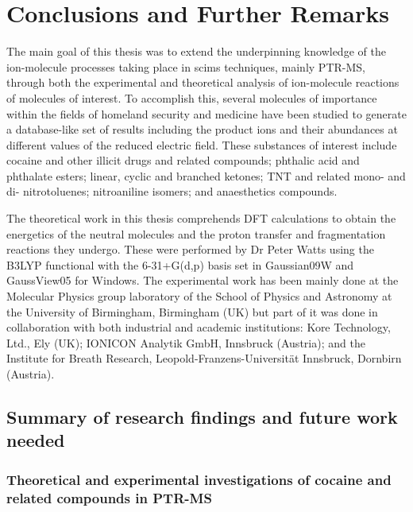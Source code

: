 \chapter{Conclusions and Further Remarks}

The main goal of this thesis was to extend the underpinning knowledge of the ion-molecule processes taking place in \acrshort{scims} techniques, mainly PTR-MS, through both the experimental and theoretical analysis of ion-molecule reactions of molecules of interest. %
%
To accomplish this, several molecules of importance within the fields of homeland security and medicine have been studied to generate a database-like set of results including the product ions and their abundances at different values of the reduced electric field.
%
These substances of interest include  cocaine and other illicit drugs and related compounds; 
phthalic acid and phthalate esters; 
linear, cyclic and branched ketones; 
TNT and related mono- and di- nitrotoluenes;
nitroaniline isomers;
and 
anaesthetics compounds.



The theoretical work in this thesis comprehends DFT calculations to obtain the energetics of the neutral molecules and the proton transfer and fragmentation reactions they undergo.
%
These were performed by Dr Peter Watts using the B3LYP functional with the 6-31+G(d,p) basis set in Gaussian09W and GaussView05 for Windows.
%
The experimental work has been mainly done at the  Molecular Physics group laboratory of the School of Physics and Astronomy at the University of Birmingham, Birmingham (UK)
but part of it was done in collaboration with both industrial and academic institutions: 
Kore Technology, Ltd.,  Ely (UK);
IONICON Analytik GmbH, Innsbruck (Austria);
and
the Institute for Breath Research, Leopold-Franzens-Universität Innsbruck, Dornbirn (Austria).


\section{Summary of research findings and future work needed}


\subsection{Theoretical and experimental investigations of cocaine and related compounds
in PTR-MS}



